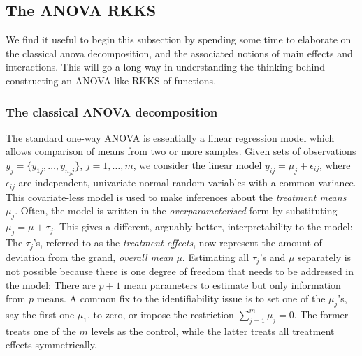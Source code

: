 \subsection{The ANOVA RKKS}

We find it useful to begin this subsection by spending some time to elaborate on the classical \gls{anova} decomposition, and the associated notions of main effects and interactions.
This will go a long way in understanding the thinking behind constructing an ANOVA-like RKKS of functions.

\subsubsection{The classical ANOVA decomposition}

The standard one-way ANOVA is essentially a linear regression model which allows comparison of means from two or more samples.
Given sets of observations $y_j = \{y_{1j},\dots,y_{n_jj}\}$, $j=1,\dots,m$, we consider the linear model $y_{ij} = \mu_j + \epsilon_{ij}$, where $\epsilon_{ij}$ are independent, univariate normal random variables with a common variance.
This covariate-less model is used to make inferences about the  \emph{treatment means} $\mu_j$.
Often, the model is written in the \emph{overparameterised} form by substituting $\mu_j = \mu + \tau_j$.
This gives a different, arguably better, interpretability to the model: The $\tau_j$'s, referred to as the \emph{treatment effects}, now represent the amount of deviation from the grand, \emph{overall mean} $\mu$.
Estimating all $\tau_j$'s and $\mu$ separately is not possible because there is one degree of freedom that needs to be addressed in the model: There are $p+1$ mean parameters to estimate but only information from $p$ means.
A common fix to the identifiability issue is to set one of the $\mu_j$'s, say the first one $\mu_1$, to zero, or impose the restriction $\sum_{j=1}^m \mu_j = 0$.
The former treats one of the $m$ levels as the control, while the latter treats all treatment effects symmetrically.

